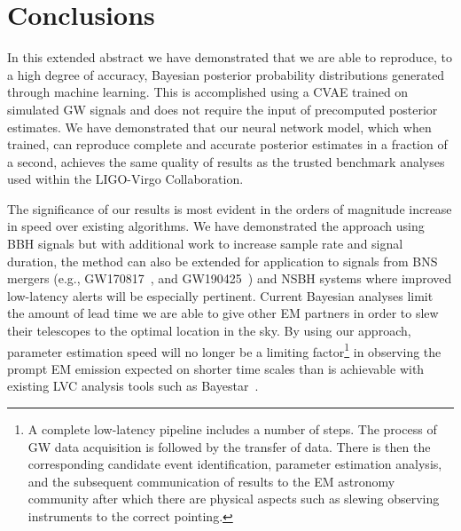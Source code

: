\documentclass{article}
\begin{document}
%
%

%
%
%
\section{Conclusions}

In this extended abstract we have demonstrated that we are able to reproduce, to a high
degree of accuracy, Bayesian posterior probability distributions generated
through machine learning. This is accomplished using a \ac{CVAE} trained on
simulated \ac{GW} signals and does not require the input of precomputed
posterior estimates. We have demonstrated that our neural network model, which
when trained, can reproduce complete and accurate posterior estimates in
a fraction of a second, achieves the same quality of results as the
trusted benchmark analyses used within the LIGO-Virgo Collaboration.

%
%
The significance of our results is most evident in the orders of magnitude
increase in speed over existing algorithms. We have demonstrated the approach
using \ac{BBH} signals but with additional work to increase sample rate
and signal duration, the method can also be extended for application to
signals from \ac{BNS} mergers (e.g., GW170817~\cite{PhysRevLett.119.161101},
and GW190425~\cite{2020ApJ...892L...3A}) and \ac{NSBH} systems where
improved low-latency alerts will be especially pertinent. Current Bayesian 
analyses limit the amount of lead time we are able to give other 
\ac{EM} partners in order to slew their telescopes to the 
optimal location in the sky. By using our
approach, parameter estimation speed will no longer be a limiting
factor\footnote{A complete low-latency pipeline includes a number of
steps. The process of \ac{GW} data acquisition is followed by the transfer of
data. There is then the corresponding candidate event identification,
parameter estimation analysis, and the subsequent communication of results to
the \ac{EM} astronomy community after which there are physical aspects such as
slewing observing instruments to the correct pointing.} in observing the prompt
\ac{EM} emission expected on shorter time scales than is achievable with
existing \ac{LVC} analysis tools such as Bayestar~\cite{2016PhRvD..93b4013S}.
\end{document}
